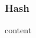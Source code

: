 

\begin{frame}
	\frametitle{Hash}
	content
	{ \ttfamily
		\randomstring
		
		\randomstring
		
		\randomstring
		
		\texttt{\meaning\foo}
		
		
		\randomstring
		
		\randomstring
		
		\randomstring
	}
\end{frame}
